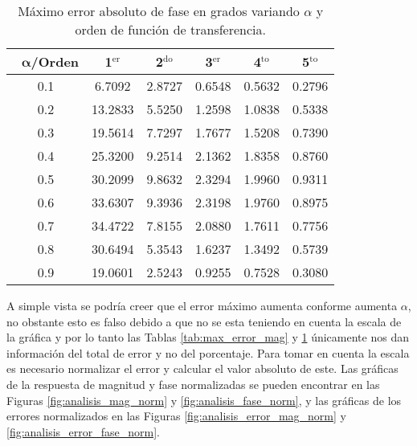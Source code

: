 	\begin{table}[!hbp]                                 
	\centering            
	\caption{Máximo error absoluto de fase en grados variando $\alpha$ y orden de función de transferencia.}                           
	\label{tab:max_error_fase}                               
		\begin{tabular}{cccccc}
			\hline                                             
			$\,\,\,\,\bm{\alpha}$\textbf{/Orden} & \textbf{1$^{\mathrm{er}}$} & \textbf{2$^{\mathrm{do}}$} & \textbf{3$^{\mathrm{er}}$} & \textbf{4$^{\mathrm{to}}$} & \textbf{5$^{\mathrm{to}}$} \\                     
			\hline                                             
			0.1 & 6.7092 & 2.8727 & 0.6548 & 0.5632 & 0.2796 \\ 
			                                             
			0.2 & 13.2833 & 5.5250 & 1.2598 & 1.0838 & 0.5338 \\
			                                            
			0.3 & 19.5614 & 7.7297 & 1.7677 & 1.5208 & 0.7390 \\
			                                              
			0.4 & 25.3200 & 9.2514 & 2.1362 & 1.8358 & 0.8760 \\
			                                            
			0.5 & 30.2099 & 9.8632 & 2.3294 & 1.9960 & 0.9311 \\
			                                             
			0.6 & 33.6307 & 9.3936 & 2.3198 & 1.9760 & 0.8975 \\
			                                             
			0.7 & 34.4722 & 7.8155 & 2.0880 & 1.7611 & 0.7756 \\
			                                             
			0.8 & 30.6494 & 5.3543 & 1.6237 & 1.3492 & 0.5739 \\
			                                             
			0.9 & 19.0601 & 2.5243 & 0.9255 & 0.7528 & 0.3080 \\
			\hline                                             
		\end{tabular}                                                             
	\end{table}

	A simple vista se podría creer que el error máximo aumenta conforme aumenta $\alpha$, no obstante esto es falso debido a que no se esta teniendo en cuenta la escala de la gráfica y por lo tanto las Tablas \ref{tab:max_error_mag} y \ref{tab:max_error_fase} únicamente nos dan información del total de error y no del porcentaje. Para tomar en cuenta la escala es necesario normalizar el error y calcular el valor absoluto de este. Las gráficas de la respuesta de magnitud y fase normalizadas se pueden encontrar en las Figuras \ref{fig:analisis_mag_norm} y \ref{fig:analisis_fase_norm}, y las gráficas de los errores normalizados en las Figuras \ref{fig:analisis_error_mag_norm} y \ref{fig:analisis_error_fase_norm}.
	
